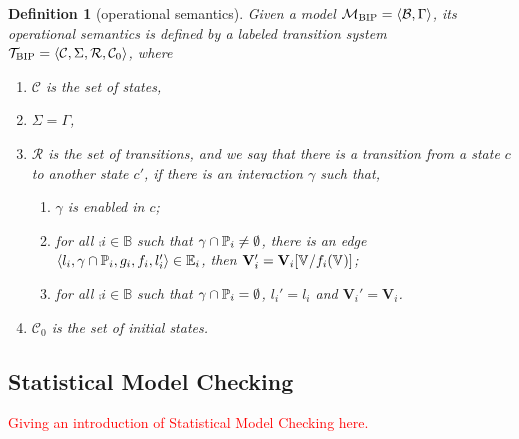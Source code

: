 \documentclass[conference]{IEEEtran}
\newtheorem{definition}{Definition}
\begin{document}
\begin{definition} [\BIP operational semantics]
	\label{operational-semantics}
	Given a \BIP model $\mathcal{M}_{\textsc{BIP}}=\langle{\ensuremath{\mathcal{B}},\Gamma}\rangle$,
	its operational semantics is defined by a labeled transition system
	$\mathcal{T}_{\textsc{BIP}} = \langle{\mathcal{C}, \Sigma, \mathcal{R}, \mathcal{C}_{0}}\rangle$, where
	\begin{enumerate}
		\item $\mathcal{C}$ is the set of states,
		\item $\Sigma = \Gamma $,
		\item $\mathcal{R}$ is the set of transitions,
		and we say that there is a transition from a state $c$
		to another state $c'$,
		if there is an interaction $\gamma $ such that,
		\begin{enumerate}
			\item $\gamma$ is enabled in $c$;
			\item for all $\comp{i} \in \mathbb{B}$ such that
			$\gamma \cap \mathbb{P}_{i} \neq \emptyset$, there is an edge
			$\langle{l_i, \gamma \cap \ensuremath{\mathbb{P}_{i}}, g_i, f_i, l_i'}\rangle \in \mathbb{E}_{i} $,
			then $\mathbf{V}'_{i} = \mathbf{V}_{i}[\mathbb{V}_{} / f_i(\mathbb{V}_{})]$;
			\item for all $\comp{i} \in \mathbb{B} $ such that
			$\gamma \cap \mathbb{P}_{i} = \emptyset $,
			$l_i' = l_i$ and $\mathbf{V}_i' = \mathbf{V}_i$.
		\end{enumerate}
		\item $\mathcal{C}_{0}$ is the set of initial states.
	\end{enumerate}
\end{definition}

%
%
%

\subsection{Statistical Model Checking}
\textcolor{red}{
Giving an introduction of Statistical Model Checking here.
}
\end{document}
